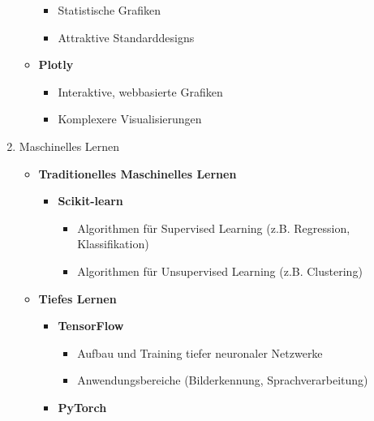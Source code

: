 \documentclass{vorlage-design-main}
\begin{document}
\begin{enumerate}
\begin{itemize}
\begin{itemize}
    \item
      Statistische Grafiken
    \item
      Attraktive Standarddesigns
    \end{itemize}
  \item
    \textbf{Plotly}

    \begin{itemize}

    \item
      Interaktive, webbasierte Grafiken
    \item
      Komplexere Visualisierungen
    \end{itemize}
  \end{itemize}
\item
  Maschinelles Lernen

  \begin{itemize}

  \item
    \textbf{Traditionelles Maschinelles Lernen}

    \begin{itemize}

    \item
      \textbf{Scikit-learn}

      \begin{itemize}

      \item
        Algorithmen für Supervised Learning (z.B. Regression,
        Klassifikation)
      \item
        Algorithmen für Unsupervised Learning (z.B. Clustering)
      \end{itemize}
    \end{itemize}
  \item
    \textbf{Tiefes Lernen}

    \begin{itemize}

    \item
      \textbf{TensorFlow}

      \begin{itemize}

      \item
        Aufbau und Training tiefer neuronaler Netzwerke
      \item
        Anwendungsbereiche (Bilderkennung, Sprachverarbeitung)
      \end{itemize}
    \item
      \textbf{PyTorch}

      \begin{itemize}


\end{itemize}
\end{itemize}
\end{itemize}
\end{enumerate}
\end{document}

